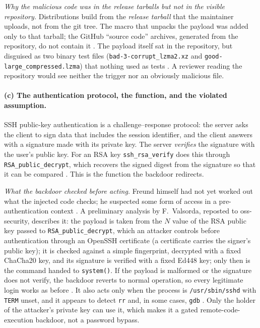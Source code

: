 \documentclass[11pt,a4paper]{article}
\newcommand{\code}[1]{\texttt{#1}}
\begin{document}
\emph{Why the malicious code was in the release tarballs but not in the visible repository.} Distributions build from the
\emph{release tarball} that the maintainer uploads, not from the git tree. The macro that unpacks the payload was added only to
that tarball; the GitHub ``source code'' archives, generated from the repository, do not contain it \cite{freund}. The payload
itself sat in the repository, but disguised as two binary test files (\code{bad-3-corrupt\_lzma2.xz} and
\code{good-large\_compressed.lzma}) that nothing used as tests \cite{freund}. A reviewer reading the repository would see neither the
trigger nor an obviously malicious file.

\paragraph{(c) The authentication protocol, the function, and the violated assumption.} SSH public-key authentication is a
challenge--response protocol: the server asks the client to sign data that includes the session identifier, and the client answers
with a signature made with its private key. The server \emph{verifies} the signature with the user's public key. For an RSA key
\code{ssh\_rsa\_verify} does this through \code{RSA\_public\_decrypt}, which recovers the signed digest from the signature so that
it can be compared \cite{freund}. This is the function the backdoor redirects.

\emph{What the backdoor checked before acting.} Freund himself had not yet worked out what the injected code checks; he
suspected some form of access in a pre-authentication context \cite{freund}. A preliminary analysis by F.~Valsorda, reposted
to oss-security, describes it: the payload is taken from the $N$ value of the RSA public key passed to
\code{RSA\_public\_decrypt}, which an attacker controls before authentication through an OpenSSH certificate (a certificate
carries the signer's public key); it is checked against a simple fingerprint, decrypted with a fixed ChaCha20 key, and its
signature is verified with a fixed Ed448 key; only then is the command handed to \code{system()}. If the payload is malformed or the
signature does not verify, the backdoor reverts to normal operation, so every legitimate login works as before
\cite{patrakov}. It also acts only when the process is \code{/usr/sbin/sshd} with \code{TERM} unset, and it appears to detect
\code{rr} and, in some cases, \code{gdb} \cite{freund}. Only the holder of the attacker's private key can use it, which makes
it a gated remote-code-execution backdoor, not a password bypass.
\end{document}
